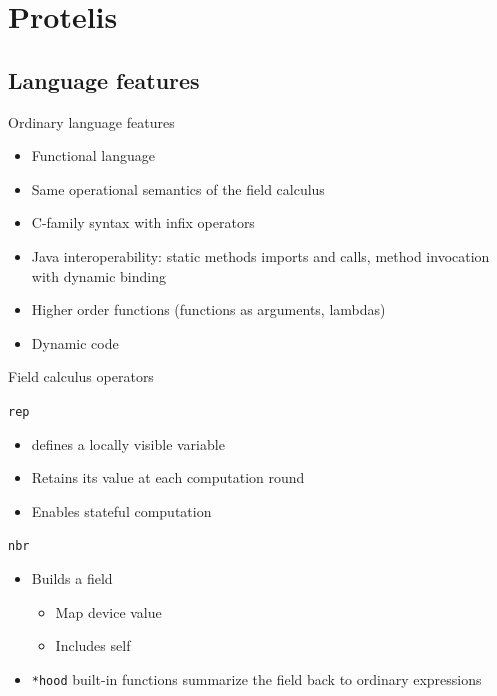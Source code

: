 \documentclass[presentation]{beamer} %
\begin{document}
\section{Protelis}

\subsection{Language features}

\begin{frame}{Ordinary language features}
  \begin{block} {}
   \begin{itemize}
    \item Functional language
    \item Same operational semantics of the field calculus 
    \item C-family syntax with infix operators
    \item Java interoperability: static methods imports and calls, method invocation with dynamic binding
    \item Higher order functions (functions as arguments, lambdas)
    \item Dynamic code
   \end{itemize}
  \end{block}
\end{frame}

\begin{frame}{Field calculus operators}
  \begin{block} {\texttt{rep}}
   \begin{itemize}
    \item defines a locally visible variable
    \item Retains its value at each computation round
    \item Enables stateful computation
   \end{itemize}
  \end{block}
  \begin{block} {\texttt{nbr}}
   \begin{itemize}
    \item Builds a field
    \begin{itemize}
      \item Map device \textrightarrow value
      \item Includes self
    \end{itemize}
    \item \texttt{*hood} built-in functions summarize the field back to ordinary expressions
   \end{itemize}
  \end{block}
\end{frame}
\end{document}

